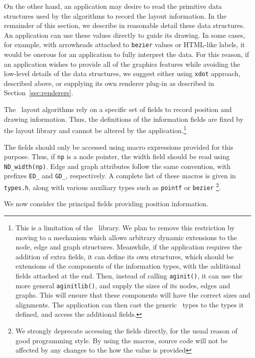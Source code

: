 On the other hand, an application may desire to read the primitive
data structures used by the algorithms to record the layout information.
In the remainder of this section, 
we describe in reasonable detail these data structures.
An application can
use these values directly to guide its drawing. In some cases, for example,
with arrowheads attached to {\tt bezier} values or HTML-like labels, it
would be onerous for an application to fully interpret the data.
For this reason,
if an application wishes to provide all of the
graphics features while avoiding the low-level details of the data
structures, we suggest either using {\tt xdot} approach, described above,
or supplying its own renderer plug-in as described in
Section~\ref{sec:renderers}.

The \gviz\ layout algorithms rely on a specific set of fields
to record position and drawing information.
Thus, the definitions
of the information fields are fixed by the layout library and
cannot be altered by the application.\footnote{This is a limitation
of the \graph\ library. We plan to remove this restriction by moving to
a mechanism which allows arbitrary dynamic extensions to the
node, edge and graph structures. Meanwhile, if the application requires
the addition of extra fields, it can define its own structures, which
should be extensions of the components of the information types, with
the additional fields attached at the end. Then, instead of calling
{\tt aginit()}, it can use the more general {\tt aginitlib()}, and
supply the sizes of its nodes, edges and graphs. This will ensure
that these components will have the correct sizes and alignments. 
The application can then cast the generic \graph\ types to the
types it defined, and access the additional fields.}

The fields should only be accessed using macro expressions provided for
this purpose.
Thus, if {\tt np} is a node pointer, the width field should
be read using \verb+ND_width(np)+.
Edge and graph attributes follow the same convention, with
prefixes \verb+ED_+ and \verb+GD_+, respectively.
A complete list of these macros is given in {\tt types.h}, 
along with various auxiliary types such as {\tt pointf} or 
{\tt bezier}
\footnote{We strongly deprecate accessing the fields directly, for the usual reason
of good programming style. By using the macros, source code will not be 
affected by any changes to the how the value is provided}.

We now consider the principal fields providing position information.

